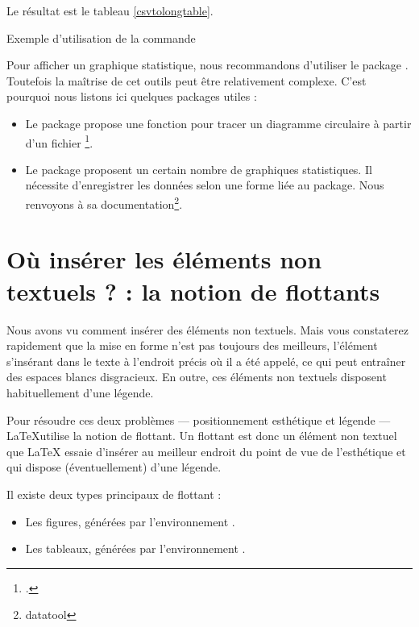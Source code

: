 Le résultat est le tableau \ref{csvtolongtable}.

\begin{table}[h]
\setcsvseparator{;}

\caption{Exemple d'utilisation de la commande }
\label{csvtolongtable}
\end{table}


\begin{plusloins}
Pour afficher un graphique statistique, nous recommandons d'utiliser le package . Toutefois la maîtrise de cet outils peut être relativement complexe. C'est pourquoi nous listons ici quelques packages utiles : 
\begin{itemize}
\item Le package  propose une fonction pour tracer un diagramme circulaire à partir d'un fichier \footcite[Sa documentation se trouve dans celle du package  :][]{csvtools_pie}. 
\item Le package  proposent un certain nombre de graphiques statistiques. Il nécessite d'enregistrer les données selon une forme liée au package. Nous renvoyons à sa documentation\footnote{datatool}.
\end{itemize}
\end{plusloins}


\section[La notion de flottants]{Où insérer les éléments non textuels ? : la notion de flottants}
\label{legende}
Nous avons vu comment insérer des éléments non textuels. Mais vous constaterez rapidement que la mise en forme n'est pas toujours des meilleurs, l'élément s'insérant dans le texte à l'endroit précis où il a été appelé, ce qui peut entraîner des espaces blancs disgracieux.
En outre, ces éléments non textuels disposent habituellement d'une légende.

Pour résoudre ces deux problèmes --- positionnement esthétique et légende --- \LaTeX utilise la notion de flottant. Un flottant est donc un élément non textuel que LaTeX essaie d'insérer au meilleur endroit du point de vue de l'esthétique et qui dispose (éventuellement) d'une légende.

Il existe deux types principaux de flottant :
\begin{itemize}
    \item Les figures, générées par l'environnement .
    \item Les tableaux, générées par l'environnement .
\end{itemize}

